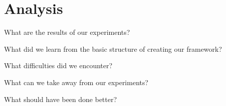 
\chapter{Analysis}

What are the results of our experiments?

What did we learn from the basic structure of creating our framework?

What difficulties did we encounter?

What can we take away from our experiments?

What should have been done better? 


\cleardoublepage